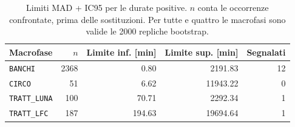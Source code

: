 \begin{table}[htbp]
\centering
\small
\begin{tabularx}{\linewidth}{@{}Xrrrr@{}}
\toprule
\textbf{Macrofase} & $n$ & \textbf{Limite inf. [min]} & \textbf{Limite sup. [min]} & \textbf{Segnalati}\\
\midrule
\texttt{BANCHI} & \num{2368} & \num{0.80} & \num{2191.83} & 12 \\
\texttt{CIRCO} & \num{51} & \num{6.62} & \num{11943.22} & 0 \\
\texttt{TRATT\_LUNA} & \num{100} & \num{70.71} & \num{2292.34} & 1 \\
\texttt{TRATT\_LFC} & \num{187} & \num{194.63} & \num{19694.64} & 1 \\
\bottomrule
\end{tabularx}
\caption{Limiti MAD + IC95 per le durate positive. $n$ conta le occorrenze confrontate, prima delle sostituzioni. Per tutte e quattro le macrofasi sono valide le \num{2000} repliche bootstrap.}
\label{tab:duration-outlier-thresholds}
\end{table}
